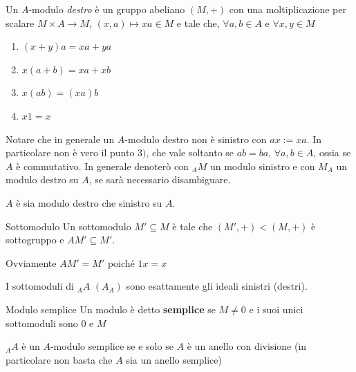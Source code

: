 \begin{definition}{}
    Un \(A\)-modulo \emph{destro} è un gruppo abeliano \({(M, +)}\) con una
    moltiplicazione per scalare \(M \times A \to M\), \({(x, a)} \mapsto xa \in
    M\) e tale che, \(\forall a, b \in A\) e \(\forall x, y \in M\) 
\begin{enumerate}[label = \arabic*')]
    \item \({(x + y)}a = xa + ya\) 
    \item \(x{(a + b)} = xa + xb\) 
    \item \(x{(ab)} = {(xa)}b\) 
    \item \(x1 = x\) 
\end{enumerate}
\end{definition}

\begin{remark}{}
    Notare che in generale un \(A\)-modulo destro non è sinistro con \(ax :=
    xa\). In particolare non è vero il punto \(3)\), che vale soltanto se \(ab =
    ba\), \(\forall a, b \in A\), ossia se \(A\) è commutativo. In generale
    denoterò con \({}_AM\) un modulo sinistro e con \(M_A\) un modulo destro su
    \(A\), se sarà necessario disambiguare.
\end{remark}

\begin{example}{}
    \(A\) è sia modulo destro che sinistro su \(A\).
\end{example}

\begin{definition}{Sottomodulo}
    Un sottomodulo \(M' \subseteq M \) è tale che \({(M', +)} < {(M, +)}\) è
    sottogruppo e \(AM' \subseteq M'\).
\end{definition}
\begin{remark}{}
    Ovviamente \(AM' = M'\) poiché \(1x = x\) 
\end{remark}

\begin{example}{}
    I sottomoduli di \({}_AA\) \((A_A)\) sono esattamente gli ideali sinistri
    (destri).
\end{example}

\begin{definition}{Modulo semplice}
    Un modulo è detto \textbf{semplice} se \(M \neq 0\) e i suoi unici
    sottomoduli sono \(0\) e \(M\) 
\end{definition}

\begin{proposition}{}
    \({}_AA\) è un \(A\)-modulo semplice se e solo se \(A\) è un anello con
    divisione (in particolare non basta che \(A\) sia un anello semplice)
\end{proposition}

